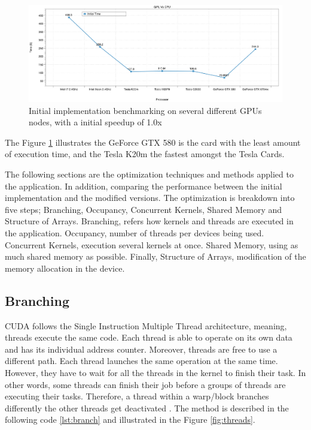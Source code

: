   \begin{figure}[htbp]
	\centering
		\includegraphics[width=1.0\textwidth]{Figures/gpu_initial.png}
		\smallskip
	\caption[Initial GPU results]{Initial implementation benchmarking on several different GPUs nodes, with a initial speedup of 1.0x}
	\label{fig:iniresults}
\end{figure}

The Figure \ref{fig:iniresults} illustrates the GeForce GTX 580 is the card with the least amount of execution time, and the Tesla K20m the fastest amongst the Tesla Cards. 


The following sections are the optimization techniques and methods applied to the application. In addition, comparing the performance between the initial implementation and the modified versions. The optimization is breakdown into five steps; Branching, Occupancy, Concurrent Kernels, Shared Memory and Structure of Arrays. Branching, refers how kernels and threads are executed in the application. Occupancy, number of threads per devices being used. Concurrent Kernels, execution several kernels at once. Shared Memory, using as much shared memory as possible. Finally, Structure of Arrays, modification of the memory allocation in the device.

 \subsection{Branching}
 
 CUDA follows the Single Instruction Multiple Thread architecture, meaning, threads execute the same code. Each thread is able to operate on its own data and has its individual address counter. Moreover, threads are free to use a different path. Each thread launches the same operation at the same time. However, they have to wait for all the threads in the kernel to finish their task. In other words, some threads can finish their job before a groups of threads are executing their tasks. Therefore, a thread within a warp/block branches differently the other threads get deactivated \cite{hoermanngpu}. The method is described in the following code \ref{lst:branch} and  illustrated in the Figure \ref{fig:threads}.

